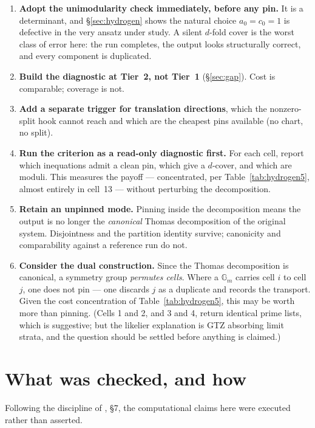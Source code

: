 \documentclass[11pt]{article}
\newcommand{\Gm}{\mathbb{G}_m}
\theoremstyle{plain}
\theoremstyle{definition}
\theoremstyle{remark}
\begin{document}
\begin{enumerate}
\item \textbf{Adopt the unimodularity check immediately, before any pin.} It is
      a determinant, and \S\ref{sec:hydrogen} shows the natural choice
      $a_0 = c_0 = 1$ is defective in the very ansatz under study. A silent
      $d$-fold cover is the worst class of error here: the run completes, the
      output looks structurally correct, and every component is duplicated.
\item \textbf{Build the diagnostic at Tier~2, not Tier~1} (\S\ref{sec:gap}).
      Cost is comparable; coverage is not.
\item \textbf{Add a separate trigger for translation directions}, which the
      nonzero-split hook cannot reach and which are the cheapest pins available
      (no chart, no split).
\item \textbf{Run the criterion as a read-only diagnostic first.} For each cell,
      report which inequations admit a clean pin, which give a $d$-cover, and
      which are moduli. This measures the payoff --- concentrated, per
      Table~\ref{tab:hydrogen5}, almost entirely in cell~13 --- without
      perturbing the decomposition.
\item \textbf{Retain an unpinned mode.} Pinning inside the decomposition means
      the output is no longer the \emph{canonical} Thomas decomposition of the
      original system. Disjointness and the partition identity survive;
      canonicity and comparability against a reference run do not.
\item \textbf{Consider the dual construction.} Since the Thomas decomposition is
      canonical, a symmetry group \emph{permutes cells}. Where a $\Gm$ carries
      cell $i$ to cell $j$, one does not pin --- one discards $j$ as a duplicate
      and records the transport. Given the cost concentration of
      Table~\ref{tab:hydrogen5}, this may be worth more than pinning. (Cells 1
      and 2, and 3 and 4, return identical prime lists, which is suggestive;
      but the likelier explanation is GTZ absorbing limit strata, and the
      question should be settled before anything is claimed.)
\end{enumerate}

\section{What was checked, and how}
\label{sec:checked}

Following the discipline of \cite{ansatz25}, \S7, the computational claims here
were executed rather than asserted.
\end{document}
